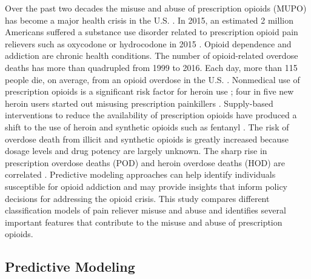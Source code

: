 \documentclass[sigconf]{acmart}
\begin{document}
Over the past two decades the misuse and abuse of prescription opioids 
(MUPO) has become a major health crisis in the U.S. \cite{volkow14}. In 2015, 
an estimated 2 million Americans suffered a substance use disorder related 
to prescription opioid pain relievers such as oxycodone or hydrocodone 
in 2015 \cite{nida18}. Opioid dependence and addiction are chronic health 
conditions. The number of opioid-related overdose deaths has more than 
quadrupled from 1999 to 2016. Each day, more than 115 people die, on average, 
from an opioid overdose in the U.S. \cite{cdc18, Rudd16}. Nonmedical use of 
prescription opioids is a significant risk factor for heroin use \cite{Rudd16}; 
four in five new heroin users started out misusing prescription painkillers 
\cite{jones13}. Supply-based interventions to reduce the availability of 
prescription opioids have produced a shift to the use of heroin and synthetic 
opioids such as fentanyl \cite{jones15}. The risk of overdose death from 
illicit and synthetic opioids is greatly increased because dosage levels and 
drug potency are largely unknown. The sharp rise in prescription overdose 
deaths (POD) and heroin overdose deaths (HOD) are correlated 
\cite{muhuri13, unick13}. Predictive modeling approaches can help identify 
individuals susceptible for opioid addiction and may provide insights that 
inform policy decisions for addressing the opioid crisis. This study compares 
different classification models of pain reliever misuse and abuse and identifies 
several important features that contribute to the misuse and abuse of 
prescription opioids. 


\subsection{Predictive Modeling}
\end{document}
